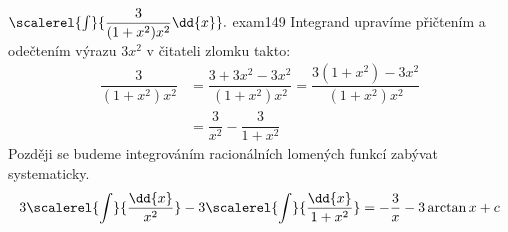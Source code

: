 \begin{mathexam}{\(\protect\scalerel{\int}{\dfrac{3}{(1+x^2)x^2}\dd{x}}.\)
  \hfill\cite[s.~29]{Knichal}}{exam149} 
  Integrand upravíme přičtením a odečtením výrazu \(3x^2\) v čitateli zlomku takto:
  \begin{align*}
    \dfrac{3}{(1+x^2)x^2} 
      &= \dfrac{3+3x^2-3x^2}{(1+x^2)x^2} = \dfrac{3(1+x^2)-3x^2}{(1+x^2)x^2}      \\
      &= \dfrac{3}{x^2} - \dfrac{3}{1+x^2}
  \end{align*}
  Později se budeme integrováním racionálních lomených funkcí zabývat systematicky.
  \[3\scalerel{\int}{\dfrac{\dd{x}}{x^2}} - 3\scalerel{\int}{\dfrac{\dd{x}}{1+x^2}}= -\dfrac{3}{x} -
    3\arctan x + c\]
\end{mathexam}